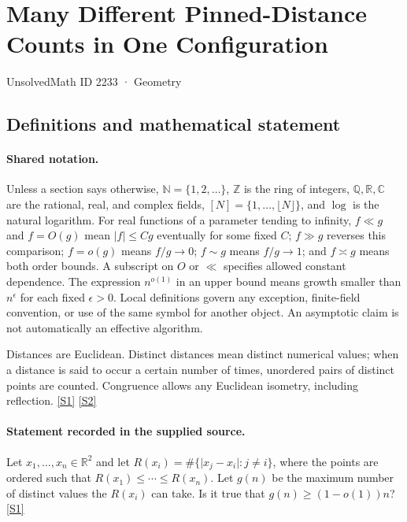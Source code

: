 \documentclass[11pt,a4paper]{article}
\newcommand{\N}{\mathbb{N}}
\newcommand{\Z}{\mathbb{Z}}
\newcommand{\Q}{\mathbb{Q}}
\newcommand{\R}{\mathbb{R}}
\newcommand{\C}{\mathbb{C}}
\newcommand{\sref}[2]{\hyperlink{source:#1:#2}{[S#2]}}
\begin{document}

\setcounter{section}{2232}

\section{Many Different Pinned-Distance Counts in One Configuration}\label{2233}

{\small\sffamily UnsolvedMath ID 2233 · Geometry}

\subsection{Definitions and mathematical statement}

\paragraph{Shared notation.}Unless a section says otherwise, $\N=\{1,2,\ldots\}$,
$\Z$ is the ring of integers, $\Q,\R,\C$ are the rational, real, and complex
fields, $[N]=\{1,\ldots,\lfloor N\rfloor\}$, and $\log$ is the natural
logarithm. For real functions of a parameter tending to infinity,
$f\ll g$ and $f=O(g)$ mean $|f|\leq Cg$ eventually for some fixed $C$;
$f\gg g$ reverses this comparison; $f=o(g)$ means $f/g\to0$;
$f\sim g$ means $f/g\to1$; and $f\asymp g$ means both order bounds.
A subscript on $O$ or $\ll$ specifies allowed constant dependence.
The expression $n^{o(1)}$ in an upper bound means growth smaller than
$n^\epsilon$ for each fixed $\epsilon>0$. Local definitions govern any
exception, finite-field convention, or use of the same symbol for another
object. An asymptotic claim is not automatically an effective algorithm.



Distances are Euclidean. Distinct distances mean distinct numerical values; when a distance is said to occur a certain number of times, unordered pairs of distinct points are counted. Congruence allows any Euclidean isometry, including reflection. \sref{2233}{1} \sref{2233}{2}

\paragraph{Statement recorded in the supplied source.}
Let $x_1,\ldots,x_n\in \mathbb{R}^2$ and let $R(x_i)=\#\{ \lvert x_j-x_i\rvert : j\neq i\}$, where the points are ordered such that $ R(x_1)\leq \cdots \leq R(x_n). $ Let $g(n)$ be the maximum number of distinct values the $R(x_i)$ can take. Is it true that $g(n) \geq (1-o(1))n$? \sref{2233}{1}
\end{document}
